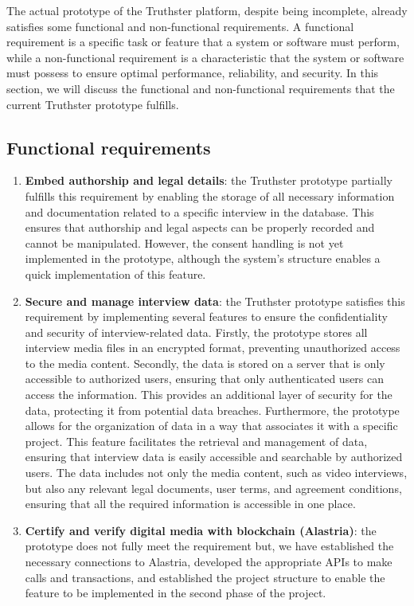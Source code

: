 \documentclass[target=mst,aauheader=]{thud}
\begin{document}
The actual prototype of the Truthster platform, despite being incomplete, already satisfies some functional and non-functional requirements. A functional requirement is a specific task or feature that a system or software must perform, while a non-functional requirement is a characteristic that the system or software must possess to ensure optimal performance, reliability, and security. In this section, we will discuss the functional and non-functional requirements that the current Truthster prototype fulfills.\par
\subsection{Functional requirements}

    \begin{enumerate}

        \item \textbf{Embed authorship and legal details}: the Truthster prototype partially fulfills this requirement by enabling the storage of all necessary information and documentation related to a specific interview in the database. This ensures that authorship and legal aspects can be properly recorded and cannot be manipulated. However, the consent handling is not yet implemented in the prototype, although the system's structure enables a quick implementation of this feature.
        \item \textbf{Secure and manage interview data}: the Truthster prototype satisfies this requirement by implementing several features to ensure the confidentiality and security of interview-related data. Firstly, the prototype stores all interview media files in an encrypted format, preventing unauthorized access to the media content. Secondly, the data is stored on a server that is only accessible to authorized users, ensuring that only authenticated users can access the information. This provides an additional layer of security for the data, protecting it from potential data breaches. Furthermore, the prototype allows for the organization of data in a way that associates it with a specific project. This feature facilitates the retrieval and management of data, ensuring that interview data is easily accessible and searchable by authorized users. The data includes not only the media content, such as video interviews, but also any relevant legal documents, user terms, and agreement conditions, ensuring that all the required information is accessible in one place.
        \item \textbf{Certify and verify digital media with blockchain (Alastria)}: the prototype does not fully meet the requirement but, we have established the necessary connections to Alastria, developed the appropriate APIs to make calls and transactions, and established the project structure to enable the feature to be implemented in the second phase of the project.
   
    \end{enumerate}
\end{document}
